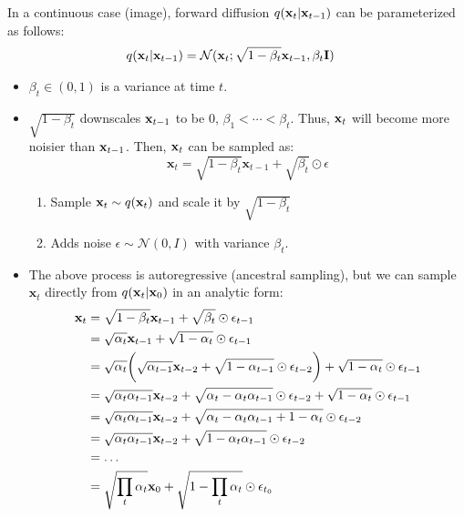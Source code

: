 In a continuous case (\eg image), forward diffusion $q({\mathbf{x}}_t \vert {\mathbf{x}}_{t-1})$ can be parameterized as follows:
\begin{align}
	q({\mathbf{x}}_t \vert {\mathbf{x}}_{t-1}) &= \mathcal{N}(\mathbf{x}_t; \sqrt{1 - \beta_t} {\mathbf{x}}_{t-1}, \beta_t\mathbf{I})
	\label{eq:forward_diffusion}
\end{align}
\begin{itemize}
		\item $\beta_t\in (0,1)$ is a variance at time $t$.
		\item $\sqrt{1 - \beta_t}$ downscales ${\mathbf{x}}_{t-1}$ to be 0, $\beta_1<\cdots<\beta_t$. Thus, ${\mathbf{x}}_t$ will become more noisier than ${\mathbf{x}}_{t-1}$. Then, ${\mathbf{x}}_t$ can be sampled as:
			$$\mathbf{x}_t= \sqrt{1 - \beta_t} \mathbf{x}_{t-1}+ \sqrt{\beta_t} \odot \epsilon$$
			\begin{enumerate}
				\item Sample ${\mathbf{x}}_{t}\sim q({\mathbf{x}}_t)$ and scale it by $\sqrt{1 - \beta_t}$
				\item Adds noise $\epsilon\sim \mathcal{N}(0,I)$ with variance $\beta_t$.
			\end{enumerate}
		\item The above process is autoregressive (\ie ancestral sampling), but we can sample $\mathbf{x}_t$ directly from $q(\mathbf{x}_t|{\mathbf{x}}_0)$ in an analytic form:
\begin{align}
	\rvx_t &= \sqrt{1 - \beta_t} \mathbf{x}_{t-1}+ \sqrt{\beta_t} \odot \epsilon_{t-1}\\
						   &= \sqrt{\alpha_t} \mathbf{x}_{t-1}+ \sqrt{1-\alpha_t} \odot \epsilon_{t-1}\\
						   &= \sqrt{\alpha_t} \bigg(\sqrt{\alpha_{t-1}} \mathbf{x}_{t-2}+ \sqrt{1-\alpha_{t-1}} \odot \epsilon_{t-2}\bigg) + \sqrt{1-\alpha_t} \odot \epsilon_{t-1}\\
						   &= \sqrt{\alpha_t\alpha_{t-1}} \mathbf{x}_{t-2} + \sqrt{\alpha_t-\alpha_t\alpha_{t-1}} \odot \epsilon_{t-2} + \sqrt{1-\alpha_t} \odot \epsilon_{t-1}\\
						   &= \sqrt{\alpha_t\alpha_{t-1}} \mathbf{x}_{t-2} + \sqrt{\alpha_t-\alpha_t\alpha_{t-1}+1-\alpha_t} \odot \epsilon_{t-2} \\
						   &= \sqrt{\alpha_t\alpha_{t-1}} \mathbf{x}_{t-2} + \sqrt{1-\alpha_t\alpha_{t-1}} \odot \epsilon_{t-2} \\
						   &= \dots\\
						   &= \sqrt{\prod_{t}\alpha_t} \mathbf{x}_{0} + \sqrt{1-\prod_t \alpha_t} \odot \epsilon_{t_0} \\

\end{align}
\end{itemize}
